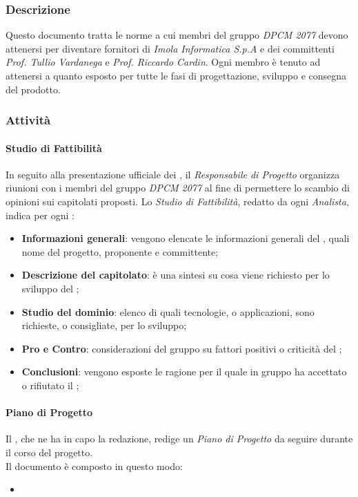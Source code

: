 		\subsubsection{Descrizione}
		Questo documento tratta le norme a cui membri del gruppo \textit{DPCM 2077} devono attenersi per diventare fornitori di \textit{Imola Informatica S.p.A} e dei committenti \textit{Prof. Tullio Vardanega} e \textit{Prof. Riccardo Cardin}. Ogni membro è tenuto ad attenersi a quanto esposto per tutte le fasi di progettazione, sviluppo e consegna del prodotto.
		\subsubsection{Attività}
			\paragraph{Studio di Fattibilità}
			In seguito alla presentazione ufficiale dei , il \textit{Responsabile di Progetto} organizza riunioni con i membri del gruppo \textit{DPCM 2077} al fine di permettere lo scambio di opinioni sui capitolati proposti. Lo \textit{Studio di Fattibilità}, redatto da ogni \textit{Analista}, indica per ogni :
			\begin{itemize}
				\item \textbf{Informazioni generali}: vengono elencate le informazioni generali del , quali nome del progetto, proponente e committente;
				\item \textbf{Descrizione del capitolato}: è una sintesi su cosa viene richiesto per lo sviluppo del ;
				\item \textbf{Studio del dominio}: elenco di quali tecnologie, o applicazioni, sono richieste, o consigliate, per lo sviluppo;
				\item \textbf{Pro e Contro}: considerazioni del gruppo su fattori positivi o criticità del ;
				\item \textbf{Conclusioni}: vengono esposte le ragione per il quale in gruppo ha accettato o rifiutato il ;
			\end{itemize}
			\paragraph{Piano di Progetto}
			Il , che ne ha in capo la redazione, redige un \textit{Piano di Progetto} da seguire durante	il corso del progetto.
			\\
			Il documento è composto in questo modo: 
			\begin{itemize}
				\item 
			\end{itemize}
